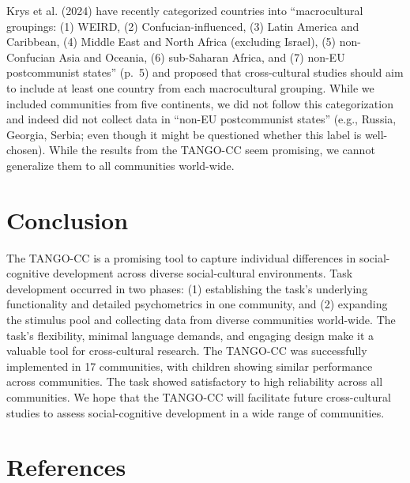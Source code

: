 \documentclass[
  man,mask,floatsintext]{apa7}
\begin{document}
Krys et al. (2024) have recently categorized countries into ``macrocultural groupings: (1) WEIRD, (2) Confucian-influenced, (3) Latin America and Caribbean, (4) Middle East and North Africa (excluding Israel), (5) non-Confucian Asia and Oceania, (6) sub-Saharan Africa, and (7) non-EU postcommunist states'' (p.~5) and proposed that cross-cultural studies should aim to include at least one country from each macrocultural grouping. While we included communities from five continents, we did not follow this categorization and indeed did not collect data in ``non-EU postcommunist states'' (e.g., Russia, Georgia, Serbia; even though it might be questioned whether this label is well-chosen). While the results from the TANGO-CC seem promising, we cannot generalize them to all communities world-wide.

\hypertarget{conclusion}{%
\section{Conclusion}\label{conclusion}}

The TANGO-CC is a promising tool to capture individual differences in social-cognitive development across diverse social-cultural environments. Task development occurred in two phases: (1) establishing the task's underlying functionality and detailed psychometrics in one community, and (2) expanding the stimulus pool and collecting data from diverse communities world-wide. The task's flexibility, minimal language demands, and engaging design make it a valuable tool for cross-cultural research. The TANGO-CC was successfully implemented in 17 communities, with children showing similar performance across communities. The task showed satisfactory to high reliability across all communities. We hope that the TANGO-CC will facilitate future cross-cultural studies to assess social-cognitive development in a wide range of communities.

\newpage

\hypertarget{references}{%
\section{References}\label{references}}

\begingroup
\setlength{\parindent}{-0.5in}
\setlength{\leftskip}{0.5in}
\end{document}
